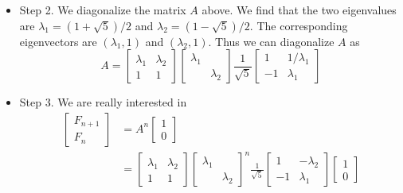 \documentclass[11pt,oneside]{amsbook}
\theoremstyle{definition}
\theoremstyle{plain}
\theoremstyle{definition}
\theoremstyle{remark}
\numberwithin{equation}{section}
\numberwithin{figure}{section}
\begin{document}
\begin{itemize}
\begin{itemize}
\[      \begin{bmatrix}F_n\\F_{n-1}\end{bmatrix}
    \]
    Denoting this square matrix by $A$, we want to find
    \[\begin{bmatrix}F_{n+1}\\F_n\end{bmatrix}
      =A^n\begin{bmatrix}1\\0\end{bmatrix}
    \]
  \item Step 2. We diagonalize the matrix $A$ above. We find that the two eigenvalues are $\lambda_1=(1+\sqrt{5})/2$ and $\lambda_2=(1-\sqrt{5})/2$. The corresponding eigenvectors are $(\lambda_1,1)$ and $(\lambda_2,1)$. Thus we can diagonalize $A$ as
    \[A=\begin{bmatrix}\lambda_1&\lambda_2\\1&1\end{bmatrix}
      \begin{bmatrix}\lambda_1\\&\lambda_2\end{bmatrix}
      \frac{1}{\sqrt{5}}
      \begin{bmatrix}1&1/\lambda_1\\-1&\lambda_1\end{bmatrix}
      \]
    \item Step 3. We are really interested in
      \begin{align*}
        \begin{bmatrix}F_{n+1}\\F_n\end{bmatrix}
        &=A^n\begin{bmatrix}1\\0\end{bmatrix}\\
        &=\begin{bmatrix}\lambda_1&\lambda_2\\1&1\end{bmatrix}
          \begin{bmatrix}\lambda_1\\&\lambda_2\end{bmatrix}^n
          \frac{1}{\sqrt{5}}
          \begin{bmatrix}1&-\lambda_2\\
            -1&\lambda_1\end{bmatrix}
          \begin{bmatrix}1\\0\end{bmatrix}\\

\end{align*}
\end{itemize}
\end{itemize}
\end{document}
